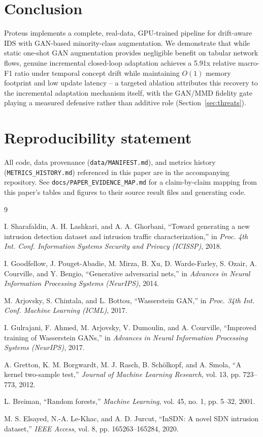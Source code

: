 \documentclass[conference]{IEEEtran}
\begin{document}
\section{Conclusion}

Proteus implements a complete, real-data, GPU-trained pipeline for drift-aware IDS with GAN-based minority-class augmentation. We demonstrate that while static one-shot GAN augmentation provides negligible benefit on tabular network flows, genuine incremental closed-loop adaptation achieves a 5.91x relative macro-F1 ratio under temporal concept drift while maintaining $O(1)$ memory footprint and low update latency -- a targeted ablation attributes this recovery to the incremental adaptation mechanism itself, with the GAN/MMD fidelity gate playing a measured defensive rather than additive role (Section~\ref{sec:threats}).

\section*{Reproducibility statement}
All code, data provenance (\texttt{data/MANIFEST.md}), and metrics history
(\texttt{METRICS\_HISTORY.md}) referenced in this paper are in the accompanying repository. See
\texttt{docs/PAPER\_EVIDENCE\_MAP.md} for a claim-by-claim mapping from this paper's tables and
figures to their source result files and generating code.


\begin{thebibliography}{9}

 I. Sharafaldin, A. H. Lashkari, and A. A. Ghorbani, ``Toward
generating a new intrusion detection dataset and intrusion traffic characterization,'' in
\textit{Proc. 4th Int. Conf. Information Systems Security and Privacy (ICISSP)}, 2018.

 I. Goodfellow, J. Pouget-Abadie, M. Mirza, B. Xu, D. Warde-Farley,
S. Ozair, A. Courville, and Y. Bengio, ``Generative adversarial nets,'' in \textit{Advances in
Neural Information Processing Systems (NeurIPS)}, 2014.

 M. Arjovsky, S. Chintala, and L. Bottou, ``Wasserstein GAN,'' in
\textit{Proc. 34th Int. Conf. Machine Learning (ICML)}, 2017.

 I. Gulrajani, F. Ahmed, M. Arjovsky, V. Dumoulin, and A. Courville,
``Improved training of Wasserstein GANs,'' in \textit{Advances in Neural Information Processing
Systems (NeurIPS)}, 2017.

 A. Gretton, K. M. Borgwardt, M. J. Rasch, B. Sch\"olkopf, and
A. Smola, ``A kernel two-sample test,'' \textit{Journal of Machine Learning Research}, vol. 13,
pp. 723--773, 2012.

 L. Breiman, ``Random forests,'' \textit{Machine Learning}, vol. 45,
no. 1, pp. 5--32, 2001.

 M. S. Elsayed, N.-A. Le-Khac, and A. D. Jurcut, ``InSDN: A novel SDN
intrusion dataset,'' \textit{IEEE Access}, vol. 8, pp. 165263--165284, 2020.

\end{thebibliography}
\end{document}
